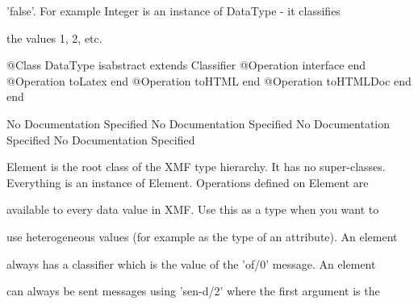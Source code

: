       'false'. For example Integer is an instance of DataType - it classifies

      the values 1, 2, etc.
\begin{Interface}
@Class DataType isabstract extends Classifier
  @Operation interface end
  @Operation toLatex end
  @Operation toHTML end
  @Operation toHTMLDoc end
end
\end{Interface}
No Documentation Specified
No Documentation Specified
No Documentation Specified
No Documentation Specified

      Element is the root class of the XMF type hierarchy. It has no super-classes.
      Everything is an instance of Element. Operations defined on Element are

      available to every data value in XMF. Use this as a type when you want to

      use heterogeneous values (for example as the type of an attribute). An element

      always has a classifier which is the value of the 'of/0' message. An element

      can always be sent messages using 'sen-d/2' where the first argument is the

